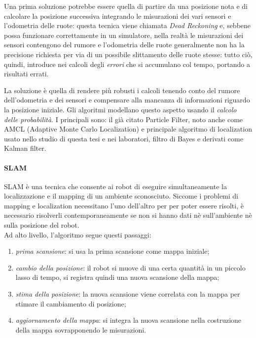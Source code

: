 Una prima soluzione potrebbe essere quella di partire da una posizione nota e di calcolare la posizione
successiva integrando le misurazioni dei vari sensori e l'odometria delle ruote: questa tecnica viene
chiamata \textit{Dead Reckoning} e, sebbene possa funzionare correttamente in un simulatore, nella realtà
le misurazioni dei sensori contengono del rumore e l'odometria delle ruote generalmente non ha la
precisione richiesta per via di un possibile slittamento delle ruote stesse: tutto ciò, quindi, introduce
nei calcoli degli \textit{errori} che si accumulano col tempo, portando a risultati errati.

La soluzione è quella di rendere più robusti i calcoli tenendo conto del rumore dell'odometria e dei
sensori e compensare alla mancanza di informazioni riguardo la posizione iniziale. Gli algoritmi
modellano questo aspetto usando il \textit{calcolo delle probabilità}. I principali sono: il già citato
Particle Filter, noto anche come AMCL (Adaptive Monte Carlo Localization) e principale algoritmo di
localization usato nello studio di questa tesi e nei laboratori, filtro di Bayes e derivati come Kalman
filter.

\paragraph{SLAM}
\label{par:slam}
SLAM è una tecnica che consente ai robot di eseguire simultaneamente la localizzazione e il mapping
di un ambiente sconosciuto. Siccome i problemi di mapping e localization necessitano l'uno dell'altro
per per poter essere risolti, è necessario risolverli contemporaneamente se non si hanno dati
nè sull'ambiente nè sulla posizione del robot.\\
Ad alto livello, l'algoritmo segue questi passaggi:
\begin{enumerate}
	\item \textit{prima scansione}: si usa la prima scansione come mappa iniziale;
	\item \textit{cambio della posizione}: il robot si muove di una certa quantità in un piccolo
	      lasso di tempo, si registra quindi una nuova scansione della mappa;
	\item \textit{stima della posizione}: la nuova scansione viene correlata con la mappa per
	      stimare il cambiamento di posizione;
	\item \textit{aggiornamento della mappa}: si integra la nuova scansione nella costruzione della mappa
	      sovrapponendo le misurazioni.
\end{enumerate}

